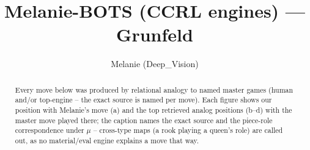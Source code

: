 \documentclass[11pt]{article}
\title{Melanie-BOTS (CCRL engines) — Grunfeld}
\author{Melanie (Deep\_Vision)}
\date{}
\begin{document}
\maketitle

\begin{abstract}Every move below was produced by relational analogy to named master games (human and/or top-engine -- the exact source is named per move). Each figure shows our position with Melanie's move (a) and the top retrieved analog positions (b--d) with the master move played there; the caption names the exact source and the piece-role correspondence under $\mu$ -- cross-type maps (a rook playing a queen's role) are called out, as no material/eval engine explains a move that way.\end{abstract}

\begin{figure}[p]\centering
\begin{subfigure}{0.46\textwidth}\centering
\resizebox{\linewidth}{!}{%
\newchessgame
\chessboard[
  setfen={rnbqk2r/ppp1ppbp/6p1/8/3PP3/2P5/P4PPP/R1BQKBNR w KQkq - 1 7},
  showmover=false,
  pgfstyle=straightmove, color=movearrow, markmove={f1-c4}
]}
\caption{}
\end{subfigure}\hfill
\begin{subfigure}{0.46\textwidth}\centering
\resizebox{\linewidth}{!}{%
\newchessgame
\chessboard[
  setfen={rnbqk2r/ppp1ppbp/6p1/8/3PP3/2P5/P4PPP/R1BQKBNR w KQkq - 1 7},
  showmover=false,
  pgfstyle=straightmove, color=movearrow, markmove={f1-c4}
]}
\caption{}
\end{subfigure}
\\[4pt]
\begin{subfigure}{0.46\textwidth}\centering
\resizebox{\linewidth}{!}{%
\newchessgame
\chessboard[
  setfen={rnbqk2r/ppp1ppbp/6p1/8/3PP3/2P5/P4PPP/R1BQKBNR w KQkq - 1 7},
  showmover=false,
  pgfstyle=straightmove, color=movearrow, markmove={f1-c4}
]}
\caption{}
\end{subfigure}\hfill
\begin{subfigure}{0.46\textwidth}\centering
\resizebox{\linewidth}{!}{%
\newchessgame
\chessboard[
  setfen={rnbqk2r/ppp1ppbp/6p1/8/3PP3/2P5/P4PPP/R1BQKBNR w KQkq - 1 7},
  showmover=false,
  pgfstyle=straightmove, color=movearrow, markmove={f1-c4}
]}
\caption{}
\end{subfigure}

\end{figure}
\end{document}
